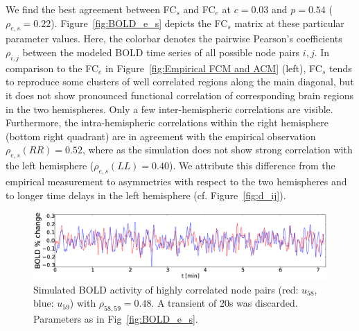 \documentclass[fleqn,10pt]{wlpeerj}
\begin{document}
We find the best agreement between FC$_s$ and FC$_e$ at $c=0.03$ and $p=0.54$ ($\rho_{e,s}=0.22$).
Figure~\ref{fig:BOLD_e_s} depicts the FC$_s$ matrix at these particular parameter values. Here, the colorbar denotes the
pairwise Pearson's coefficients $\rho_{i,j}$ between the modeled BOLD time series of all
possible node pairs ${i,j}$. In comparison to the FC$_e$ in Figure~\ref{fig:Empirical FCM and ACM} (left), FC$_s$ tends
to reproduce some clusters of well correlated regions along the main diagonal, but it does not show pronounced
functional correlation of corresponding brain regions in the two hemispheres. Only a few inter-hemispheric correlations
are visible. Furthermore, the intra-hemispheric correlations within the right hemisphere (bottom right quadrant) are in
agreement with the empirical observation $\rho_{e,s}(RR)=0.52$, where as the simulation does not show strong correlation
with the left hemisphere ($\rho_{e,s}(LL)=0.40$). We attribute this difference from the empirical measurement to
asymmetries with respect to the two hemispheres and to longer time delays in the left hemisphere (cf.
Figure~\ref{fig:d_ij}).


\begin{figure}[htpb] \centering
	 \includegraphics[width=\textwidth]{Figures/cor_BOLD_ACM_sim_no_best_new} 
   \caption{Simulated BOLD activity of highly correlated node pairs (red: $u_{58}$, blue: $u_{59}$) with
$\rho_{58,59}=0.48$. A transient of 20s was discarded.
Parameters as in Fig~\ref{fig:BOLD_e_s}.
} 
  \label{fig:BOLD_nodes}
\end{figure} 
\end{document}
